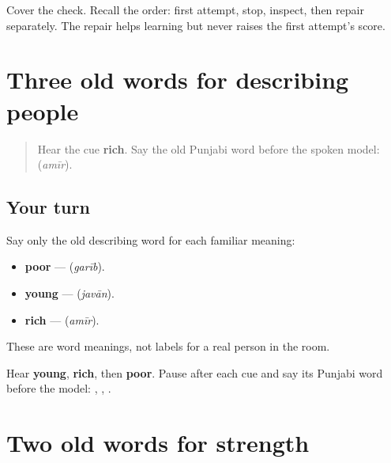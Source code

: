 \begin{tcolorbox}[breakable,colback=teal!4,colframe=teal!35!black,title={Before you move on}]
Cover the check. Recall the order: first attempt, stop, inspect, then repair separately. The repair helps learning but never raises the first attempt's score.
\end{tcolorbox}
\section[\texorpdfstring{\pa{ਅਮੀਰ} · \pa{ਗ਼ਰੀਬ} · \pa{ਜਵਾਨ} (amīr · garīb …)}{ਅਮੀਰ · ਗ਼ਰੀਬ · ਜਵਾਨ (amīr · garīb …)}]{Three old words for describing people}

\label{lesson:PA-R159-people-quality-recall}



\begin{quote}
Hear the cue \textbf{rich}. Say the old Punjabi word before the spoken model: \textbf{} (\emph{amīr}).
\end{quote}

\subsection*{Your turn}
Say only the old describing word for each familiar meaning:

\begin{itemize}
\raggedright
  \item \textbf{poor} — \textbf{} (\emph{garīb}).
  \item \textbf{young} — \textbf{} (\emph{javān}).
  \item \textbf{rich} — \textbf{} (\emph{amīr}).
\end{itemize}

These are word meanings, not labels for a real person in the room.

\begin{tcolorbox}[breakable,colback=teal!4,colframe=teal!35!black,title={Before you move on}]
Hear \textbf{young}, \textbf{rich}, then \textbf{poor}. Pause after each cue and say its Punjabi word before the model: \textbf{}, \textbf{}, \textbf{}.
\end{tcolorbox}
\section[\texorpdfstring{\pa{ਤਕੜਾ} · \pa{ਕਮਜ਼ੋਰ} (takṛā · kamzor)}{ਤਕੜਾ · ਕਮਜ਼ੋਰ (takṛā · kamzor)}]{Two old words for strength}

